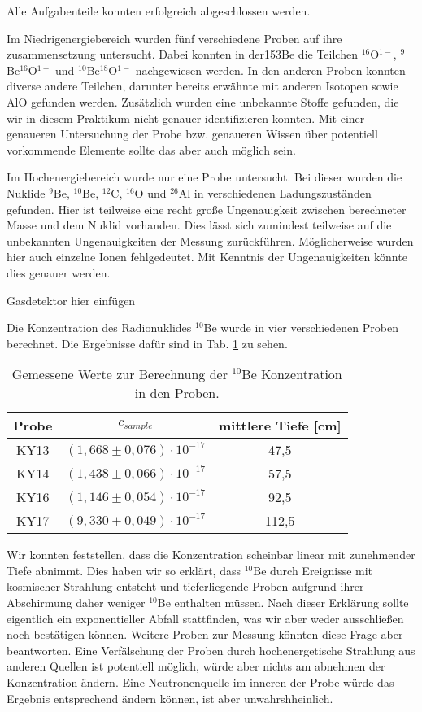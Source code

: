 
Alle Aufgabenteile konnten erfolgreich abgeschlossen werden.

Im Niedrigenergiebereich wurden fünf verschiedene Proben auf ihre zusammensetzung untersucht.
Dabei konnten in der153Be die Teilchen $^{16}$O$^{1-}$, $^{9}$Be$^{16}$O$^{1-}$ und $^{10}$Be$^{18}$O$^{1-}$ nachgewiesen werden.
In den anderen Proben konnten diverse andere Teilchen, darunter bereits erwähnte mit anderen Isotopen sowie AlO gefunden werden.
Zusätzlich wurden eine unbekannte Stoffe gefunden, die wir in diesem Praktikum nicht genauer identifizieren konnten.
Mit einer genaueren Untersuchung der Probe bzw. genaueren Wissen über potentiell vorkommende Elemente sollte das aber auch möglich sein.

Im Hochenergiebereich wurde nur eine Probe untersucht.
Bei dieser wurden die Nuklide $^{9}$Be, $^{10}$Be, $^{12}$C, $^{16}$O und $^{26}$Al in verschiedenen Ladungszuständen gefunden.
Hier ist teilweise eine recht große Ungenauigkeit zwischen berechneter Masse und dem Nuklid vorhanden.
Dies lässt sich zumindest teilweise auf die unbekannten Ungenauigkeiten der Messung zurückführen.
Möglicherweise wurden hier auch einzelne Ionen fehlgedeutet.
Mit Kenntnis der Ungenauigkeiten könnte dies genauer werden.

Gasdetektor hier einfügen

Die Konzentration des Radionuklides $^{10}$Be wurde in vier verschiedenen Proben berechnet.
Die Ergebnisse dafür sind in Tab. \ref{dis_con} zu sehen.
\begin{table}[h]
\centering
\caption{Gemessene Werte zur Berechnung der $^{10}$Be Konzentration in den Proben.}
\begin{tabular}{|c |c| c|}
\hline
Probe& $c_{sample}$ & mittlere Tiefe [cm] \\
\hline
KY13 &  $(1,668 \pm 0,076) \cdot 10^{-17}$ & 47,5\\
KY14 &  $(1,438 \pm 0,066) \cdot 10^{-17}$ & 57,5 \\
KY16 &  $(1,146 \pm 0,054) \cdot 10^{-17}$ & 92,5\\
KY17 &  $(9,330 \pm 0,049) \cdot 10^{-17}$ & 112,5\\
\hline
\end{tabular}
\label{dis_con}
\end{table}
Wir konnten feststellen, dass die Konzentration scheinbar linear mit zunehmender Tiefe abnimmt.
Dies haben wir so erklärt, dass $^{10}$Be durch Ereignisse mit kosmischer Strahlung entsteht und tieferliegende Proben aufgrund ihrer Abschirmung daher weniger $^{10}$Be enthalten müssen.
Nach dieser Erklärung sollte eigentlich ein exponentieller Abfall stattfinden, was wir aber weder ausschließen noch bestätigen können.
Weitere Proben zur Messung könnten diese Frage aber beantworten.
Eine Verfälschung der Proben durch hochenergetische Strahlung aus anderen Quellen ist potentiell möglich, würde aber nichts am abnehmen der Konzentration ändern.
Eine Neutronenquelle im inneren der Probe würde das Ergebnis entsprechend ändern können, ist aber unwahrshheinlich.
